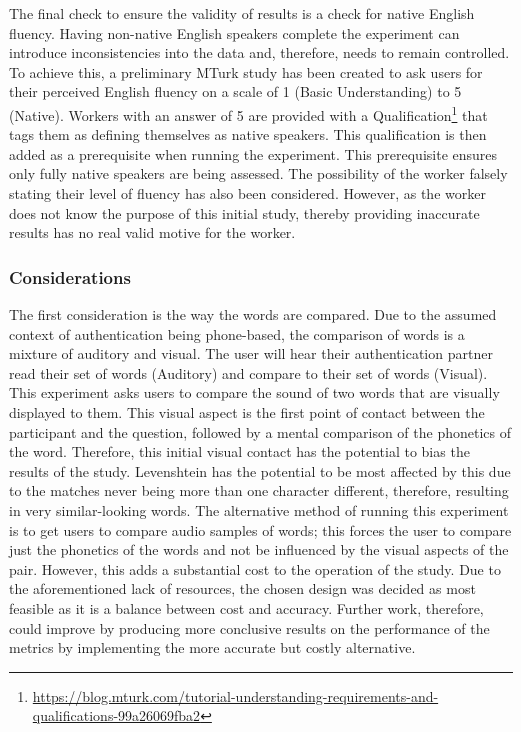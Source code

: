 The final check to ensure the validity of results is a check for native English fluency. Having non-native English speakers complete the 
experiment can introduce inconsistencies into the 
data and, therefore, needs to remain controlled. To achieve this, a preliminary MTurk study has been created to ask users for their perceived 
English fluency on a scale of 1 (Basic Understanding) to 5 (Native). 
Workers with an answer of 5 are provided with a 
Qualification\footnote{\url{https://blog.mturk.com/tutorial-understanding-requirements-and-qualifications-99a26069fba2}} 
that tags them as defining themselves as native speakers. This qualification is then 
added as a prerequisite when running the experiment. This prerequisite ensures 
only fully native speakers are being assessed. The possibility of the 
worker falsely stating their level of fluency has also been considered. 
However, as the worker does not know the purpose of this initial study,
thereby providing inaccurate results has no real valid motive for the 
worker.

\subsubsection{Considerations}
\label{sec:exp1_considerations}

The first consideration is the way the words are compared. Due to the assumed context of authentication being phone-based, the comparison of words is a mixture of auditory and visual. The user will hear their authentication partner read their set of words (Auditory) and compare to their set of words (Visual). This experiment asks users to compare the sound of two words that are visually displayed to them. This visual aspect is the first point of contact between the participant and the question, followed by a mental comparison of the phonetics of the word. Therefore, this initial visual contact has the potential to bias the results of the study. Levenshtein has the potential to be most affected by this due to the matches never being more than one character different, therefore, resulting in very similar-looking words. The alternative method of running this experiment is to get users to compare audio samples of words; this forces the user to compare just the phonetics of the words and not be influenced by the visual aspects of the pair. However, this adds a substantial cost to the operation of the study. Due to the aforementioned lack of resources, the chosen design was decided as most feasible as it is a balance between cost and accuracy. Further work, therefore, could improve by producing more conclusive results on the performance of the metrics by implementing the more accurate but costly alternative.

